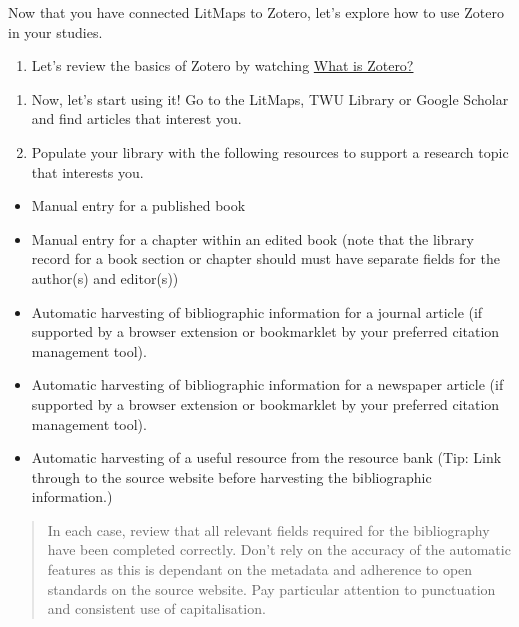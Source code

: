 \documentclass[
]{book}
\providecommand{\tightlist}{%
  \setlength{\itemsep}{0pt}\setlength{\parskip}{0pt}}
\theoremstyle{definition}
\theoremstyle{definition}
\theoremstyle{definition}
\theoremstyle{definition}
\theoremstyle{remark}
\begin{document}
\begin{reflect}
Now that you have connected LitMaps to Zotero, let's explore how to use Zotero in your studies.

\begin{enumerate}
\def\labelenumi{\arabic{enumi}.}
\tightlist
\item
  Let's review the basics of Zotero by watching \href{https://www.youtube.com/watch?v=5xClqW2Jv04}{What is Zotero?}
\end{enumerate}

\begin{enumerate}
\def\labelenumi{\arabic{enumi}.}
\setcounter{enumi}{1}
\item
  Now, let's start using it! Go to the LitMaps, TWU Library or Google Scholar and find articles that interest you.
\item
  Populate your library with the following resources to support a research topic that interests you.
\end{enumerate}

\begin{itemize}
\tightlist
\item
  Manual entry for a published book
\item
  Manual entry for a chapter within an edited book (note that the library record for a book section or chapter should must have separate fields for the author(s) and editor(s))
\item
  Automatic harvesting of bibliographic information for a journal article (if supported by a browser extension or bookmarklet by your preferred citation management tool).
\item
  Automatic harvesting of bibliographic information for a newspaper article (if supported by a browser extension or bookmarklet by your preferred citation management tool).
\item
  Automatic harvesting of a useful resource from the resource bank (Tip: Link through to the source website before harvesting the bibliographic information.)
\end{itemize}

\begin{quote}
In each case, review that all relevant fields required for the bibliography have been completed correctly. Don't rely on the accuracy of the automatic features as this is dependant on the metadata and adherence to open standards on the source website. Pay particular attention to punctuation and consistent use of capitalisation.
\end{quote}


\end{reflect}
\end{document}
